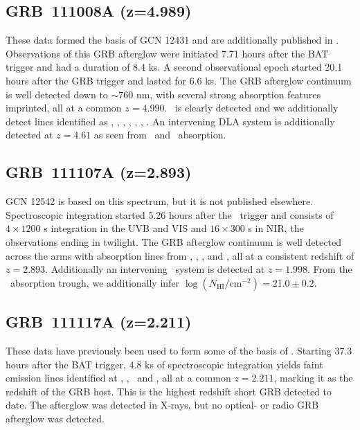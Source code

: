 \documentclass[longauth]{aa}    %
\begin{document}
\subsection{GRB~111008A  (z=4.989)} \label{111008}

These data formed the basis of GCN 12431 \citep{GCN12431} and are additionally
published in \citet{Sparre2014}. Observations of this GRB afterglow were
initiated 7.71 hours after the BAT trigger and had a duration of 8.4 ks. A second
observational epoch started 20.1 hours after the GRB trigger and lasted for
6.6 ks. The GRB afterglow continuum is well detected down to $\sim$760 nm, with
several strong absorption features imprinted, all at a common $z = 4.990$.
\lya~is clearly detected and we additionally detect lines identified as \SIii,
\feii, \civ, \mgii, \SIii*, \sii*, \oi*. An intervening DLA system is
additionally detected at  $z = 4.61$ as seen from \lya~and \mgii~absorption.

\subsection{GRB~111107A (z=2.893)} \label{111107}

GCN 12542 \citep{GCN12542} is based on this spectrum, but it is not published
elsewhere. Spectroscopic integration started 5.26 hours after the \swift~trigger
and consists of $4 \times 1200$ s integration in the UVB and VIS and $16 \times
300$ s in NIR, the observations ending in twilight. The GRB afterglow continuum
is well detected across the arms with absorption lines from \lya, \civ, \feii,
and \mgii, all at a consistent redshift of $z = 2.893$. Additionally an
intervening \mgii~system is detected at $z = 1.998$. From the \lya~absorption
trough, we additionally infer $\log (N_{\mathrm{HI}}/\mathrm{cm}^{-2}) = 21.0
\pm 0.2$.

\subsection{GRB~111117A (z=2.211)} \label{111117}

These data have previously been used to form some of the basis of
\citet{Selsing2017}. Starting 37.3 hours after the BAT trigger, 4.8 ks of
spectroscopic integration yields faint emission lines identified at \oii, \hb,
\oiii~and \ha, all at a common $z = 2.211$, marking it as the redshift of the
GRB host. This is the highest redshift short GRB detected to date. The afterglow
was detected in X-rays, but no optical- or radio GRB afterglow was detected.
\end{document}
